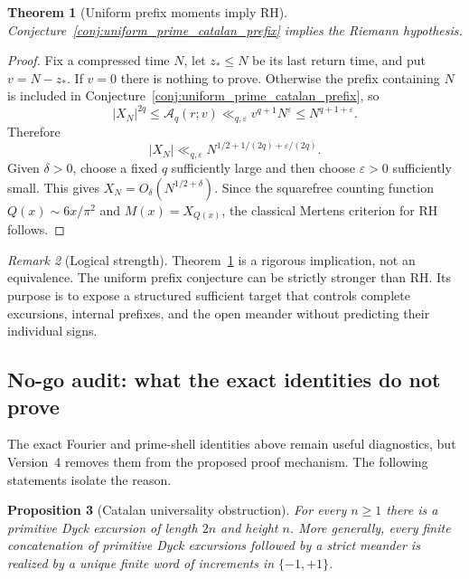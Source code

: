 \documentclass[11pt]{amsart}
\numberwithin{equation}{section}
\theoremstyle{plain}
\newtheorem{theorem}{Theorem}[section]
\newtheorem{proposition}[theorem]{Proposition}
\theoremstyle{definition}
\theoremstyle{remark}
\newtheorem{remark}[theorem]{Remark}
\newcommand{\Mert}{M}
\newcommand{\eps}{\varepsilon}
\begin{document}
\begin{theorem}[Uniform prefix moments imply RH]
\label{thm:uniform_prefix_implies_rh}
Conjecture~\ref{conj:uniform_prime_catalan_prefix} implies the Riemann
hypothesis.
\end{theorem}

\begin{proof}
Fix a compressed time $N$, let $z_\ast\leq N$ be its last return time, and put
$v=N-z_\ast$.  If $v=0$ there is nothing to prove.  Otherwise the prefix
containing $N$ is included in Conjecture~\ref{conj:uniform_prime_catalan_prefix},
so
\begin{equation}
|X_N|^{2q}\leq\mathcal A_q(r;v)
\ll_{q,\eps}v^{q+1}N^\eps
\leq N^{q+1+\eps}.
\end{equation}
Therefore
\begin{equation}
|X_N|\ll_{q,\eps}
N^{1/2+1/(2q)+\eps/(2q)}.
\end{equation}
Given $\delta>0$, choose a fixed $q$ sufficiently large and then choose
$\eps>0$ sufficiently small.  This gives
$X_N=O_\delta(N^{1/2+\delta})$.  Since the squarefree counting function
$Q(x)\sim6x/\pi^2$ and $\Mert(x)=X_{Q(x)}$, the classical Mertens criterion
for RH follows.
\end{proof}

\begin{remark}[Logical strength]
Theorem~\ref{thm:uniform_prefix_implies_rh} is a rigorous implication, not an
equivalence.  The uniform prefix conjecture can be strictly stronger than RH.
Its purpose is to expose a structured sufficient target that controls complete
excursions, internal prefixes, and the open meander without predicting their
individual signs.
\end{remark}

\subsection{No-go audit: what the exact identities do not prove}

The exact Fourier and prime-shell identities above remain useful diagnostics,
but Version~4 removes them from the proposed proof mechanism.  The following
statements isolate the reason.

\begin{proposition}[Catalan universality obstruction]
\label{prop:catalan_universality_obstruction}
For every $n\geq1$ there is a primitive Dyck excursion of length $2n$ and
height $n$.  More generally, every finite concatenation of primitive Dyck
excursions followed by a strict meander is realized by a unique finite word
of increments in $\{-1,+1\}$.
\end{proposition}
\end{document}
